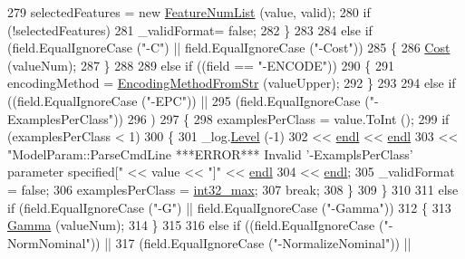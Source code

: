 \begin{DoxyCode}
279       selectedFeatures = \textcolor{keyword}{new} \hyperlink{class_k_k_m_l_l_1_1_feature_num_list}{FeatureNumList} (value, valid);
280       \textcolor{keywordflow}{if}  (!selectedFeatures)
281         \_validFormat= \textcolor{keyword}{false};
282     \}
283 
284     \textcolor{keywordflow}{else} \textcolor{keywordflow}{if}  (field.EqualIgnoreCase (\textcolor{stringliteral}{"-C"})  ||  field.EqualIgnoreCase (\textcolor{stringliteral}{"-Cost"}))
285     \{
286       \hyperlink{class_k_k_m_l_l_1_1_model_param_aa857203676a55864d0202b61bc2403bc}{Cost} (valueNum);
287     \}
288 
289     \textcolor{keywordflow}{else} \textcolor{keywordflow}{if} ((field == \textcolor{stringliteral}{"-ENCODE"}))
290     \{
291       encodingMethod = \hyperlink{class_k_k_m_l_l_1_1_model_param_a4aaa08b3e8e037ba1f8ac33b4389a53b}{EncodingMethodFromStr} (valueUpper);
292     \}
293 
294     \textcolor{keywordflow}{else} \textcolor{keywordflow}{if}  ((field.EqualIgnoreCase (\textcolor{stringliteral}{"-EPC"}))  ||  
295               (field.EqualIgnoreCase (\textcolor{stringliteral}{"-ExamplesPerClass"}))
296              )
297     \{
298       examplesPerClass = value.ToInt ();
299       \textcolor{keywordflow}{if}  (examplesPerClass < 1)
300       \{
301         \_log.\hyperlink{class_k_k_b_1_1_run_log_a32cf761d7f2e747465fd80533fdbb659}{Level} (-1) 
302           << \hyperlink{namespace_k_k_b_ad1f50f65af6adc8fa9e6f62d007818a8}{endl} << \hyperlink{namespace_k_k_b_ad1f50f65af6adc8fa9e6f62d007818a8}{endl}
303           << \textcolor{stringliteral}{"ModelParam::ParseCmdLine ***ERROR***  Invalid '-ExamplsPerClass' parameter specified["} << 
      value << \textcolor{stringliteral}{"]"} << \hyperlink{namespace_k_k_b_ad1f50f65af6adc8fa9e6f62d007818a8}{endl}
304           << \hyperlink{namespace_k_k_b_ad1f50f65af6adc8fa9e6f62d007818a8}{endl};
305         \_validFormat = \textcolor{keyword}{false};
306         examplesPerClass = \hyperlink{_k_k_base_types_8h_ab1240c5d3fea865121ed4684f8e968f6}{int32\_max};
307         \textcolor{keywordflow}{break};
308       \}
309     \}
310 
311     \textcolor{keywordflow}{else} \textcolor{keywordflow}{if}  (field.EqualIgnoreCase (\textcolor{stringliteral}{"-G"})  ||  field.EqualIgnoreCase (\textcolor{stringliteral}{"-Gamma"}))
312     \{
313       \hyperlink{class_k_k_m_l_l_1_1_model_param_ac128898ae19311796228c07e6a7923bd}{Gamma} (valueNum);
314     \}
315 
316     \textcolor{keywordflow}{else} \textcolor{keywordflow}{if}  ((field.EqualIgnoreCase (\textcolor{stringliteral}{"-NormNominal"}))               ||
317               (field.EqualIgnoreCase (\textcolor{stringliteral}{"-NormalizeNominal"}))          ||

\end{DoxyCode}

